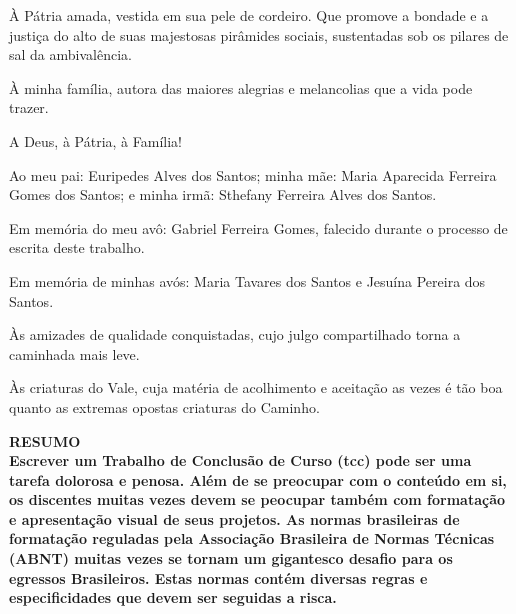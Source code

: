 \documentclass[12pt,a4paper,oneside,brazil]{abntex2}
\begin{document}
À Pátria amada,
vestida em sua pele de cordeiro. Que promove a bondade
e a justiça do alto de suas majestosas pirâmides sociais, sustentadas
sob os pilares de sal da ambivalência.


À minha família, autora das maiores alegrias e melancolias que a
vida pode trazer.

\vspace{10mm}

A Deus, à Pátria, à Família!

\vspace{20mm}

Ao meu pai: Euripedes Alves dos Santos; minha mãe: Maria
Aparecida Ferreira Gomes dos Santos; e minha irmã:
Sthefany Ferreira Alves dos Santos.

\vspace{10mm}

Em memória do meu avô: Gabriel Ferreira Gomes, falecido durante
o processo de escrita deste trabalho.

\vspace{10mm}

Em memória de minhas avós: Maria Tavares dos Santos e
Jesuína Pereira dos Santos.

\vspace{10mm}

Às amizades de qualidade conquistadas, cujo julgo compartilhado
torna a caminhada mais leve.

\vspace{30mm}


Às criaturas do Vale, cuja matéria de acolhimento e aceitação
as vezes é tão boa quanto as extremas opostas criaturas do Caminho.



\clearpage



\centering
\ABNTEXchapterfont\bfseries{\textsc{\MakeUppercase{Resumo}}}\\
\vspace*{3cm}
\justifying
\normalfont
Escrever um Trabalho de Conclusão de Curso (\acrshort{tcc}) pode ser uma tarefa dolorosa e penosa.
Além de se preocupar com o conteúdo em si, os discentes muitas vezes devem se peocupar também com formatação e
apresentação visual de seus projetos. As normas brasileiras de formatação reguladas pela Associação Brasileira de Normas Técnicas
(ABNT) muitas vezes se tornam um gigantesco desafio para os egressos Brasileiros. Estas normas contém diversas regras
e especificidades que devem ser seguidas a risca.
\end{document}

